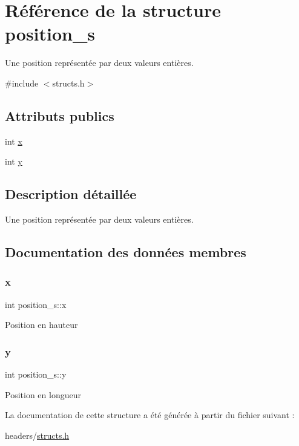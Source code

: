 \hypertarget{structposition__s}{}\section{Référence de la structure position\+\_\+s}
\label{structposition__s}


Une position représentée par deux valeurs entières.  




{\ttfamily \#include $<$structs.\+h$>$}

\subsection*{Attributs publics}
\begin{DoxyCompactItemize}
\item 
int \hyperlink{structposition__s_aa46bb783b33e7f87e559d3c33a388fb4}{x}
\item 
int \hyperlink{structposition__s_a449c5c9452deb6bb3c79b786d8469bb2}{y}
\end{DoxyCompactItemize}


\subsection{Description détaillée}
Une position représentée par deux valeurs entières. 

\subsection{Documentation des données membres}
\mbox{\label{structposition__s_aa46bb783b33e7f87e559d3c33a388fb4}} 
\subsubsection{\texorpdfstring{x}{x}}
{\footnotesize\ttfamily int position\+\_\+s\+::x}

Position en hauteur \mbox{\label{structposition__s_a449c5c9452deb6bb3c79b786d8469bb2}} 
\subsubsection{\texorpdfstring{y}{y}}
{\footnotesize\ttfamily int position\+\_\+s\+::y}

Position en longueur 

La documentation de cette structure a été générée à partir du fichier suivant \+:\begin{DoxyCompactItemize}
\item 
headers/\hyperlink{structs_8h}{structs.\+h}\end{DoxyCompactItemize}
